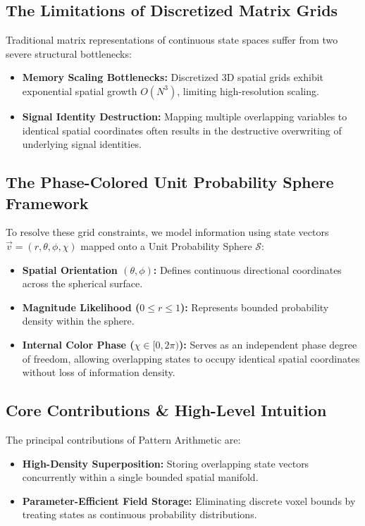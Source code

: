 \documentclass[12pt, a4paper]{article}
\begin{document}
\subsection{The Limitations of Discretized Matrix Grids}
Traditional matrix representations of continuous state spaces suffer from two severe structural bottlenecks:
\begin{itemize}
    \item \textbf{Memory Scaling Bottlenecks:} Discretized 3D spatial grids exhibit exponential spatial growth $O(N^3)$, limiting high-resolution scaling.
    \item \textbf{Signal Identity Destruction:} Mapping multiple overlapping variables to identical spatial coordinates often results in the destructive overwriting of underlying signal identities.
\end{itemize}

\subsection{The Phase-Colored Unit Probability Sphere Framework}
To resolve these grid constraints, we model information using state vectors $\vec{v} = (r, \theta, \phi, \chi)$ mapped onto a Unit Probability Sphere $\mathcal{S}$:
\begin{itemize}
    \item \textbf{Spatial Orientation $(\theta, \phi)$:} Defines continuous directional coordinates across the spherical surface.
    \item \textbf{Magnitude Likelihood ($0 \leq r \leq 1$):} Represents bounded probability density within the sphere.
    \item \textbf{Internal Color Phase ($\chi \in [0, 2\pi)$):} Serves as an independent phase degree of freedom, allowing overlapping states to occupy identical spatial coordinates without loss of information density.
\end{itemize}

\subsection{Core Contributions \& High-Level Intuition}
The principal contributions of Pattern Arithmetic are:
\begin{itemize}
    \item \textbf{High-Density Superposition:} Storing overlapping state vectors concurrently within a single bounded spatial manifold.
    \item \textbf{Parameter-Efficient Field Storage:} Eliminating discrete voxel bounds by treating states as continuous probability distributions.
\end{itemize}
\end{document}
